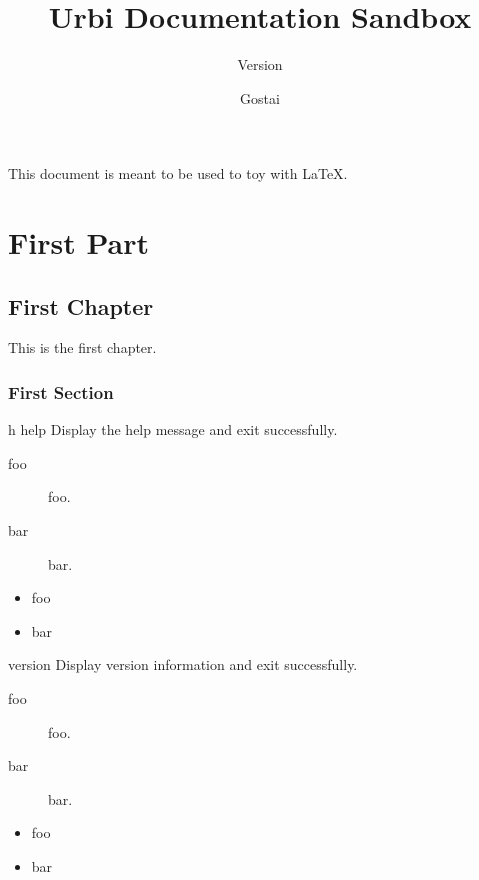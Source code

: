\documentclass[openright,twoside,11pt]{book}
\title{Urbi Documentation Sandbox}
\subtitle{Version \VcsDescription}
\author{Gostai}
\begin{document}
\maketitle

This document is meant to be used to toy with \LaTeX{}.

\tableofcontents
\part{First Part}
\chapter{First Chapter}

This is the first chapter.

\section{First Section}
\newcommand{\optionHelp}
  {Display the help message and exit successfully.}

\newcommand{\optionVersion}
  {Display version information and exit successfully.}

\begin{options}
\item[h]{help} \optionHelp
  \begin{sublist}
    \begin{description}
    \item[foo] foo.
    \item[bar] bar.
    \end{description}
  \end{sublist}

  \begin{sublist}
    \begin{itemize}
    \item foo
    \item bar
    \end{itemize}
  \end{sublist}

\item{version} \optionVersion
  \begin{sublist}
    \begin{description}
    \item[foo] foo.
    \item[bar] bar.
    \end{description}

    \begin{itemize}
    \item foo
    \item bar
    \end{itemize}
  \end{sublist}
\end{options}
\end{document}
